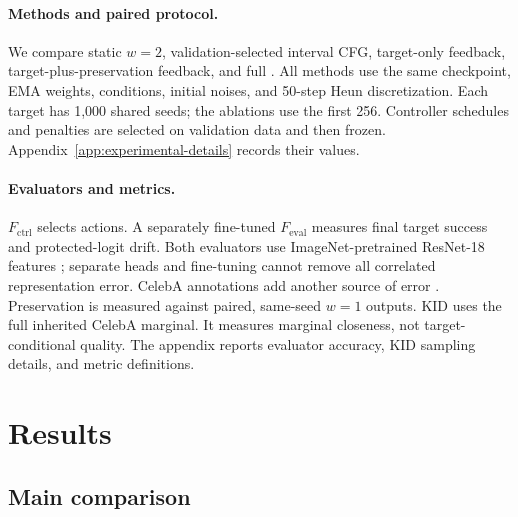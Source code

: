 \documentclass[10pt,twocolumn,letterpaper]{article}
\begin{document}
\paragraph{Methods and paired protocol.}
We compare static $w=2$, validation-selected interval CFG, target-only
feedback, target-plus-preservation feedback, and full \method. All methods use
the same checkpoint, EMA weights, conditions, initial noises, and 50-step Heun
discretization. Each target has 1,000 shared seeds; the ablations use the first 256.
Controller schedules and penalties are selected on validation data and then
frozen. Appendix~\ref{app:experimental-details} records their values.

\paragraph{Evaluators and metrics.}
$F_{\mathrm{ctrl}}$ selects actions. A separately fine-tuned
$F_{\mathrm{eval}}$ measures final target success and protected-logit drift.
Both evaluators use ImageNet-pretrained ResNet-18 features \cite{he2016resnet};
separate heads and fine-tuning cannot remove all correlated representation
error. CelebA annotations add another source of error \cite{wu2023celeba}.
Preservation is measured against paired, same-seed $w=1$ outputs. KID
\cite{binkowski2018mmd} uses the full inherited CelebA marginal. It measures
marginal closeness, not target-conditional quality. The
appendix reports evaluator accuracy, KID sampling details, and metric
definitions.

\section{Results}
\label{sec:results}

\subsection{Main comparison}
\end{document}
